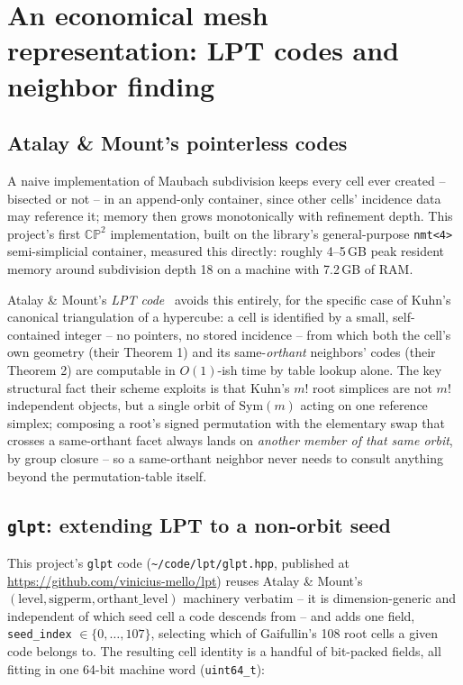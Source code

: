 \documentclass[11pt]{article}
\newcommand{\CP}{\mathbb{CP}}
\newcommand{\level}{\mathrm{level}}
\begin{document}
\section{An economical mesh representation: LPT codes and neighbor finding}
\label{sec:lpt}

\subsection{Atalay \& Mount's pointerless codes}

A naive implementation of Maubach subdivision keeps every cell ever
created -- bisected or not -- in an append-only container, since other
cells' incidence data may reference it; memory then grows monotonically
with refinement depth. This project's first $\CP^2$ implementation, built
on the library's general-purpose \texttt{nmt<4>} semi-simplicial container,
measured this directly: roughly 4--5\,GB peak resident memory around
subdivision depth 18 on a machine with 7.2\,GB of RAM.

Atalay \& Mount's \emph{LPT code}~\cite{atalaymount} avoids this entirely,
for the specific case of Kuhn's canonical triangulation of a hypercube: a
cell is identified by a small, self-contained integer -- no pointers, no
stored incidence -- from which both the cell's own geometry (their Theorem
1) and its same-\emph{orthant} neighbors' codes (their Theorem 2) are
computable in $O(1)$-ish time by table lookup alone. The key structural
fact their scheme exploits is that Kuhn's $m!$ root simplices are not $m!$
independent objects, but a single orbit of $\mathrm{Sym}(m)$ acting on one
reference simplex; composing a root's signed permutation with the
elementary swap that crosses a same-orthant facet always lands on
\emph{another member of that same orbit}, by group closure -- so a
same-orthant neighbor never needs to consult anything beyond the
permutation-table itself.

\subsection{\texttt{glpt}: extending LPT to a non-orbit seed}

This project's \texttt{glpt} code (\nolinkurl{~/code/lpt/glpt.hpp}, published at \url{https://github.com/vinicius-mello/lpt})
reuses Atalay \& Mount's $(\level,\mathrm{sigperm},\mathrm{orthant\_level})$
machinery verbatim -- it is dimension-generic and independent of which
seed cell a code descends from -- and adds one field, \texttt{seed\_index}
$\in\{0,\dots,107\}$, selecting which of Gaifullin's 108 root cells a given
code belongs to. The resulting cell identity is a handful of bit-packed
fields, all fitting in one 64-bit machine word (\texttt{uint64\_t}):
\end{document}
